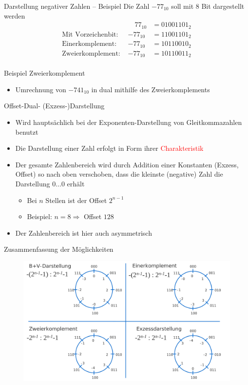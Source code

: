 \documentclass[12pt%
,aspectratio=169%
]{beamer}
\begin{document}
\begin{frame}{Darstellung negativer Zahlen -- Beispiel}
Die Zahl $-77_{10}$ soll mit $8$ Bit dargestellt werden
\begin{align*}
	& \quad 77_{10} &= 0100 1101_2 \\
\text{Mit Vorzeichenbit: } & -77_{10} &= 1100 1101_2 \\
\text{Einerkomplement: } & -77_{10} &= 1011 0010_2 \\	
\text{Zweierkomplement: } & -77_{10} &= 1011 0011_2 \\
\end{align*} 
\end{frame}

\begin{frame}{Beispiel Zweierkomplement}
\begin{itemize}
	\item Umrechnung von $-741_{10}$ in dual mithilfe des Zweierkomplements
\end{itemize}
\end{frame}

\begin{frame}{Offset-Dual- (Exzess-)Darstellung}
\begin{itemize}
	\item Wird hauptsächlich bei der Exponenten-Darstellung von Gleitkommazahlen benutzt
	\item Die Darstellung einer Zahl erfolgt in Form ihrer \textcolor{red}{Charakteristik}
	\item Der gesamte Zahlenbereich wird durch Addition einer Konstanten (Exzess, Offset) so nach oben verschoben, dass die kleinste (negative) Zahl die Darstellung $0\ldots 0$ erhält
	\begin{itemize}
		\item Bei $n$ Stellen ist der Offset $2^{n-1}$
		\item Beispiel: $n=8 \Rightarrow$ Offset $128$
	\end{itemize}
	\item Der Zahlenbereich ist hier auch asymmetrisch
\end{itemize}
\end{frame}

\begin{frame}{Zusammenfassung der Möglichkeiten}
\begin{figure}
\center
\includegraphics[scale=0.3]{pictures/darstellungen}
\end{figure}
\end{frame}
\end{document}
